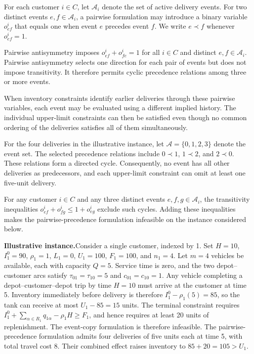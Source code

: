 \documentclass[10pt]{article}
\newcommand{\evidencebox}[1]{%
  \par\vspace{3pt}\noindent
  \colorbox{orlight}{%
    \parbox{\dimexpr\linewidth-2\fboxsep\relax}{%
      \small\textbf{Illustrative instance.}\hspace{0.35em}#1%
    }%
  }\par\vspace{4pt}
}
\begin{document}
For each customer $i\in C$, let $\mathcal A_i$ denote the set of active delivery events. For two distinct events $e,f\in\mathcal A_i$, a pairwise formulation may introduce a binary variable $o^i_{ef}$ that equals one when event $e$ precedes event $f$. We write $e\prec f$ whenever $o^i_{ef}=1$.

Pairwise antisymmetry imposes $o^i_{ef}+o^i_{fe}=1$ for all $i\in C$ and distinct $e,f\in\mathcal A_i$. Pairwise antisymmetry selects one direction for each pair of events but does not impose transitivity. It therefore permits cyclic precedence relations among three or more events.

When inventory constraints identify earlier deliveries through these pairwise variables, each event may be evaluated using a different implied history. The individual upper-limit constraints can then be satisfied even though no common ordering of the deliveries satisfies all of them simultaneously.

For the four deliveries in the illustrative instance, let $\mathcal A=\{0,1,2,3\}$ denote the event set. The selected precedence relations include $0\prec1$, $1\prec2$, and $2\prec0$. These relations form a directed cycle. Consequently, no event has all other deliveries as predecessors, and each upper-limit constraint can omit at least one five-unit delivery.

For any customer $i\in C$ and any three distinct events $e,f,g\in\mathcal A_i$, the transitivity inequalities $o^i_{ef}+o^i_{fg}\le1+o^i_{eg}$ exclude such cycles. Adding these inequalities makes the pairwise-precedence formulation infeasible on the instance considered below.

\evidencebox{Consider a single customer, indexed by 1. Set $H=10$, $I_1^0=90$, $\rho_1=1$, $L_1=0$, $U_1=100$, $F_1=100$, and $n_1=4$. Let $m=4$ vehicles be available, each with capacity $Q=5$. Service time is zero, and the two depot--customer arcs satisfy $\tau_{01}=\tau_{10}=5$ and $c_{01}=c_{10}=1$. Any vehicle completing a depot--customer--depot trip by time $H=10$ must arrive at the customer at time 5. Inventory immediately before delivery is therefore $I_1^0-\rho_1(5)=85$, so the tank can receive at most $U_1-85=15$ units. The terminal constraint requires $I_1^0+\sum_{\alpha\in R_1}q_{1\alpha}-\rho_1H\ge F_1$, and hence requires at least 20 units of replenishment. The event-copy formulation is therefore infeasible. The pairwise-precedence formulation admits four deliveries of five units each at time 5, with total travel cost $8$. Their combined effect raises inventory to $85+20=105>U_1$.}
\end{document}
